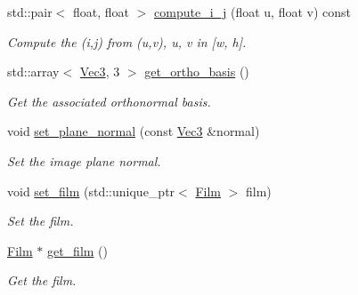 \begin{DoxyCompactItemize}
std\+::pair$<$ float, float $>$ \mbox{\hyperlink{classomg_1_1_camera_a518b3b8bf80970e81408f0286293604c}{compute\+\_\+i\+\_\+j}} (float u, float v) const
\begin{DoxyCompactList}\small\item\em Compute the (i,j) from (u,v), u, v in \mbox{[}w, h\mbox{]}. \end{DoxyCompactList}\item 
std\+::array$<$ \mbox{\hyperlink{namespaceomg_a45a9482677fee9933ff369b49894e316}{Vec3}}, 3 $>$ \mbox{\hyperlink{classomg_1_1_camera_a7bc7168312ae9923904489e792ad0526}{get\+\_\+ortho\+\_\+basis}} ()
\begin{DoxyCompactList}\small\item\em Get the associated orthonormal basis. \end{DoxyCompactList}\item 
void \mbox{\hyperlink{classomg_1_1_camera_a5983a689364dd5c9701e157b4620c2cd}{set\+\_\+plane\+\_\+normal}} (const \mbox{\hyperlink{namespaceomg_a45a9482677fee9933ff369b49894e316}{Vec3}} \&normal)
\begin{DoxyCompactList}\small\item\em Set the image plane normal. \end{DoxyCompactList}\item 
void \mbox{\hyperlink{classomg_1_1_camera_a7ad7dd69948685bc74286be8b80968cc}{set\+\_\+film}} (std\+::unique\+\_\+ptr$<$ \mbox{\hyperlink{classomg_1_1_film}{Film}} $>$ film)
\begin{DoxyCompactList}\small\item\em Set the film. \end{DoxyCompactList}\item 
\mbox{\hyperlink{classomg_1_1_film}{Film}} $\ast$ \mbox{\hyperlink{classomg_1_1_camera_a6feb3185dc41c47b1d2749d58b8d0c13}{get\+\_\+film}} ()
\begin{DoxyCompactList}\small\item\em Get the film. \end{DoxyCompactList}\end{DoxyCompactItemize}
